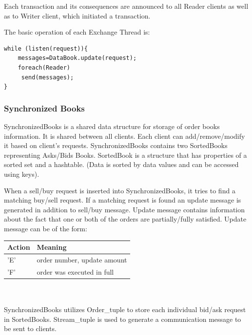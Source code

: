 \documentclass[14pt]{article}
\newcommand{\comment}[1]{}
\begin{document}
Each transaction and its consequences are announced to all Reader clients as
well as to Writer client, which initiated a transaction.

The basic operation of each Exchange Thread is:

\begin{Verbatim}
while (listen(request)){
	messages=DataBook.update(request);
	foreach(Reader)
	 send(messages);
}
\end{Verbatim}

\comment{
the first message showing an interest in exchange ExchangesThread checks if
there is an appropriate match in the data structures (i.e. if some one wants to
sell some amount of stocks the thread will look if someone wants to buy stocks
at the given price), if so the match is executed if not the request is stored in
the data structures. The results and the transaction are announced to all the
connected clients.
}

\subsubsection{Synchronized Books}
SynchronizedBooks is a shared data structure for storage of order books
information. It is shared between all clients. Each client can add/remove/modify
it based on client's requests. SynchronizedBooks contains two SortedBooks
representing Asks/Bids Books. SortedBook is a structure that has properties of a
sorted set and a hashtable. (Data is sorted by data values and can be accessed
using keys).

When a sell/buy request is inserted into SynchronizedBooks, it tries to find a
matching buy/sell request. If a matching request is found an update message is
generated in addition to sell/buy message. Update message contains information
about the fact that one or both of the orders are partially/fully
satisfied. Update message can be of the form:


\begin{tabular}{|l|l|}
  \hline
  Action & Meaning \\ \hline
  'E' & order number, update amount \\ \hline
  'F' & order was executed in full \\

  \hline
\end{tabular}
\\
\\
SynchronizedBooks utilizes Order\_tuple to store each individual bid/ask request
in SortedBooks. Stream\_tuple is used to generate a communication message to be
sent to clients.
\end{document}
